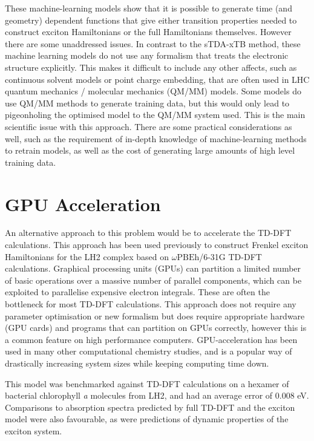 These machine-learning models show that it is possible to generate time (and geometry)
dependent functions that give either transition properties needed to construct exciton
Hamiltonians or the full Hamiltonians themselves. However there are some unaddressed
issues. In contrast to the sTDA-xTB method, these machine learning models do not 
use any formalism that treats the electronic structure explicitly. This makes it
difficult to include any other affects, such as continuous solvent models or point
charge embedding, that are often used in LHC quantum mechanics / molecular mechanics 
(QM/MM) models. Some models do use QM/MM methods to generate training data, but 
this would only lead to pigeonholing the optimised model to the QM/MM system used.
This is the main scientific issue with this approach. There are some practical
considerations as well, such as the requirement of in-depth knowledge of machine-learning 
methods to retrain models, as well as the cost of generating large amounts of high
level training data.

\section{GPU Acceleration}
\label{sec:gpu_acceleration}

An alternative approach to this problem would be to accelerate the TD-DFT calculations.
This approach has been used previously to construct Frenkel exciton Hamiltonians
for the LH2 complex based on $\omega\text{PBEh}$/6-31G TD-DFT calculations. Graphical 
processing units (GPUs) can partition a limited number of basic operations over 
a massive number of parallel components, which can be exploited to parallelise expensive 
electron integrals. These are often the bottleneck for most TD-DFT calculations.
This approach does not require any parameter optimisation or new formalism but does
require appropriate hardware (GPU cards) and programs that can partition on GPUs
correctly, however this is a common feature on high performance computers. GPU-acceleration
has been used in many other computational chemistry studies, and is a popular way 
of drastically increasing system sizes while keeping computing time down.

This model was benchmarked against TD-DFT calculations on a hexamer of bacterial
chlorophyll \emph{a} molecules from LH2, and had an average error of 0.008 eV. Comparisons
to absorption spectra predicted by full TD-DFT and the exciton model were also favourable, 
as were predictions of dynamic properties of the exciton system.

